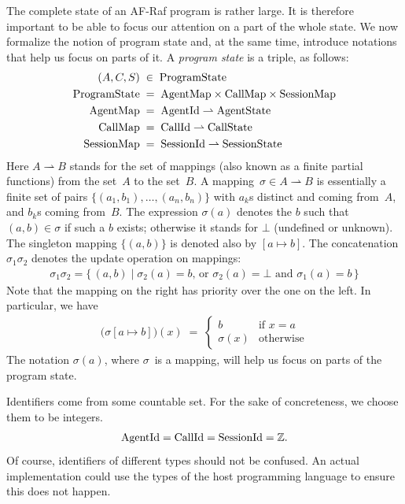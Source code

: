 \documentclass[a4paper,12pt,oneside,fleqn]{book} %
\newcommand{\pmap}{\rightharpoonup}
\begin{document}
{The complete state of an AF-Raf program is rather large. It is therefore
important to be able to focus our attention on a part of the whole state.
We now formalize the notion of program state and, at the same time,
introduce notations that help us focus on parts of it. A \emph{program
state} is a triple, as follows:
\begin{align}
(A, C, S) &\;\in\; {\rm ProgramState}
\\
{\rm ProgramState} &\;=\;
  {\rm AgentMap}\times{\rm CallMap}\times{\rm SessionMap}
\\
{\rm AgentMap} &\;=\; {\rm AgentId}\pmap{\rm AgentState}
\\
{\rm CallMap} &\;=\; {\rm CallId}\pmap{\rm CallState}
\\
{\rm SessionMap} &\;=\; {\rm SessionId}\pmap{\rm SessionState}
\end{align}
Here $A\pmap B$ stands for the set of mappings (also known as a finite
partial functions) from the set~$A$ to the set~$B$. A mapping~$\sigma\in
A\pmap B$ is essentially a finite set of pairs
$\{(a_1,b_1),\ldots,(a_n,b_n)\}$ with $a_k$s distinct and coming from~$A$,
and $b_k$s coming from~$B$. The expression $\sigma(a)$ denotes the $b$ such
that $(a,b)\in\sigma$ if such a $b$ exists; otherwise it stands for $\bot$
(undefined or unknown). The singleton mapping $\{(a,b)\}$ is denoted also by
$[a\mapsto b]$.  The concatenation $\sigma_1\sigma_2$ denotes the update
operation on mappings:
\begin{align}
\sigma_1\sigma_2 = \{\,(a,b)\mid
  \text{$\sigma_2(a)=b$, or $\sigma_2(a)=\bot$ and $\sigma_1(a)=b$}\,\}
\end{align}
Note that the mapping on the right has priority over the one on the left.
In particular, we have
\begin{align}
\bigl(\sigma[a\mapsto b]\bigr)(x) \;=\;
  \begin{cases}
  b & \text{if $x=a$} \\
  \sigma(x) & \text{otherwise}
  \end{cases}
\end{align}
The notation $\sigma(a)$, where $\sigma$~is a mapping, will help us focus
on parts of the program state.

Identifiers come from some countable set. For the sake of concreteness, we
choose them to be integers.
\begin{align}
{\rm AgentId} = {\rm CallId} = {\rm SessionId} = \mathbb{Z}.
\end{align}
Of course, identifiers of different types should not be confused. An actual
implementation could use the types of the host programming language to
ensure this does not happen.

}
\end{document}
